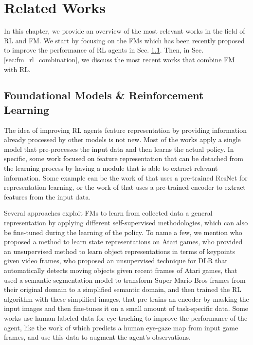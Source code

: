 
\chapter{Related Works}
\label{ch:related_work}
In this chapter, we provide an overview of the most relevant works in the field of RL and FM\@.
We start by focusing on the FMs which has been recently proposed to improve the performance of RL agents in Sec. \ref{sec:fm_rl}.
Then, in Sec. \ref{sec:fm_rl_combination}, we discuss the most recent works that combine FM with RL\@.

\section{Foundational Models \& Reinforcement Learning}\label{sec:fm_rl}
The idea of improving RL agents feature representation by providing information already processed by other models is not new.
Most of the works apply a single model that pre-processes the input data and then learns the actual policy.
In specific, some work focused on feature representation that can be detached from the learning process by having a module that is able to extract relevant information.
Some example can be the work of \citet{shah2021rrl} that uses a pre-trained ResNet for representation learning, or the work of \citet{yuan2022pre} that uses a pre-trained encoder to extract features from the input data.

Several approaches exploit FMs to learn from collected data a general representation by applying different self-supervised methodologies, which can also be fine-tuned during the learning of the policy.
To name a few, we mention \citet{anand2019unsupervised} who proposed a method to learn state representations on Atari games, \citet{kulkarni2019unsupervised} who provided an unsupervised method to learn object representations in terms of keypoints given video frames, \citet{goel2018unsupervised} who proposed an unsupervised technique for DLR that automatically detects moving objects given recent frames of Atari games, \citet{montalvo2023exploiting} that used a semantic segmentation model to transform Super Mario Bros frames from their original domain to a simplified semantic domain, and then trained the RL algorithm with these simplified images, \citet{xiao2022masked} that pre-trains an encoder by masking the input images and then fine-tunes it on a small amount of task-specific data.
Some works use human labeled data for eye-tracking \citep{zhang2020atari} to improve the performance of the agent, like the work of \citet{thammineni2023selective} which predicts a human eye-gaze map from input game frames, and use this data to augment the agent's observations.

